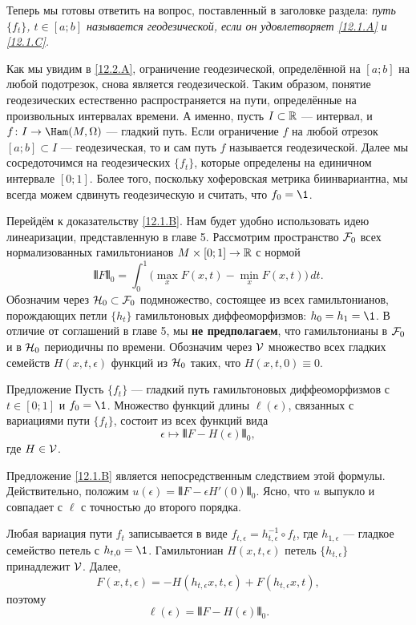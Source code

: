 Теперь мы готовы ответить на вопрос, поставленный в заголовке раздела:
\emph{путь $\{f_t\}$, $t\in[a; b]$ называется
  геодезической, если он удовлетворяет \ref{12.1.A} и \ref{12.1.C}.} 

Как мы увидим в \ref{12.2.A}, ограничение геодезической, определённой
на $[a; b]$ на любой подотрезок, снова является геодезической. 
Таким образом, понятие геодезических естественно распространяется на пути, определённые на произвольных интервалах времени. 
А именно, пусть $I\subset \mathbb{R}$ — интервал, и $f\: I\to\Ham(M,\Omega)$ — гладкий путь.
Если ограничение $f$ на любой отрезок $[a; b] \subset I$ —
геодезическая, то и сам путь $f$ называется геодезической. 
Далее мы сосредоточимся на геодезических $\{f_t\}$, которые определены
на единичном интервале $[0; 1]$. 
Более того, поскольку хоферовская метрика биинвариантна, мы всегда
можем сдвинуть геодезическую и считать, что $f_0 = \1$.  

Перейдём к доказательству \ref{12.1.B}.
Нам будет удобно использовать идею линеаризации, представленную в главе 5.
Рассмотрим пространство $\mathcal{F}_0$ всех
нормализованных гамильтонианов $M \times [0; 1] \to \mathbb{R}$ с нормой
\[\VERT F \VERT_0 = \int_0^1 \big(\max_x F(x,t) - \min_x F(x,t)\big)\, dt.\]
Обозначим через $\mathcal{H}_0 \subset \mathcal{F}_0$ подмножество,
состоящее из всех гамильтонианов, порождающих петли $\{h_t\}$
гамильтоновых диффеоморфизмов: $h_0 = h_1 = \1$.
В отличие от соглашений в главе 5,
мы \textbf{не предполагаем}, что гамильтонианы в $\mathcal{F}_0$ и в $\mathcal{H}_0$
периодичны по времени. 
Обозначим через \index[symb]{$\V$}$\V$ множество всех гладких семейств
$H(x, t, \epsilon)$ функций из $\mathcal{H}_0$ таких, что $H(x, t, 0) \equiv
0$. 

\begin{thm}{Предложение}\label{12.1.E}
Пусть $\{f_t\}$ — гладкий путь гамильтоновых диффеоморфизмов с $t
\in [0; 1]$ и $f_0 = \1$. 
Множество функций длины $\ell(\epsilon)$, связанных с вариациями пути $\{f_t\}$, состоит из всех функций вида 
\[\epsilon\mapsto\VERT F - H(\epsilon)\VERT_0,\]
где $H\in\mathcal{V}$.
\end{thm}

Предложение \ref{12.1.B} является непосредственным следствием этой формулы.
Действительно, положим $u(\epsilon) = \VERT F - \epsilon H'(0)\VERT_0$.
Ясно, что $u$ выпукло и совпадает с $\ell$ с точностью до второго порядка.

Любая вариация пути $f_t$ записывается в виде $f_{t,\epsilon} = h_{t,\epsilon}^{-1}\circ f_t$, где $h_{1,\epsilon}$ — гладкое семейство петель с $h_{t,0} = \1$.
Гамильтониан $H(x,t,\epsilon)$ петель $\{h_{t,\epsilon}\}$ принадлежит $\V$.
Далее, 
\[F(x, t, \epsilon) = -H(h_{t,\epsilon}x, t, \epsilon) + F(h_{t,\epsilon}x, t),\]
поэтому
\[\ell(\epsilon) = \VERT F - H(\epsilon)\VERT_0.\]
\qeds

